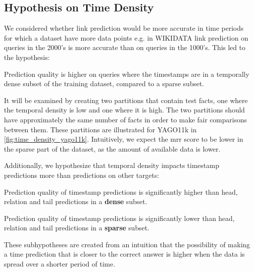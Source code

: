 \subsection{Hypothesis on Time Density}
\label{sec:hypothesis_time_density}

We considered whether link prediction would be more accurate in time periods for which a dataset have more data points e.g. in WIKIDATA link prediction on queries in the 2000's is more accurate than on queries in the 1000's. This led to the hypothesis:

\begin{hypothesis}
\label{hyp:time_density}
Prediction quality is higher on queries where the timestamps are in a temporally dense subset of the training dataset, compared to a sparse subset.
\end{hypothesis}

%
%


It will be examined by creating two partitions that contain test facts, one where the temporal density is low and one where it is high. The two partitions should have approximately the same number of facts in order to make fair comparisons between them.
These partitions are illustrated for YAGO11k in \autoref{fig:time_density_yago11k}. Intuitively, we expect the \gls{mrr} score to be lower in the sparse part of the dataset, as the amount of available data is lower.

Additionally, we hypothesize that temporal density impacts timestamp predictions more than predictions on other targets:

\begin{subhypothesis}
\label{hyp:time_density_timestamp_dense}
Prediction quality of timestamp predictions is significantly higher than head, relation and tail predictions in a \textbf{dense} subset.
\end{subhypothesis}

\begin{subhypothesis}
\label{hyp:time_density_timestamp_sparse}
Prediction quality of timestamp predictions is significantly lower than head, relation and tail predictions in a \textbf{sparse} subset.
\end{subhypothesis}

These subhypotheses are created from an intuition that the possibility of making a time prediction that is closer to the correct answer is higher when the data is spread over a shorter period of time.

